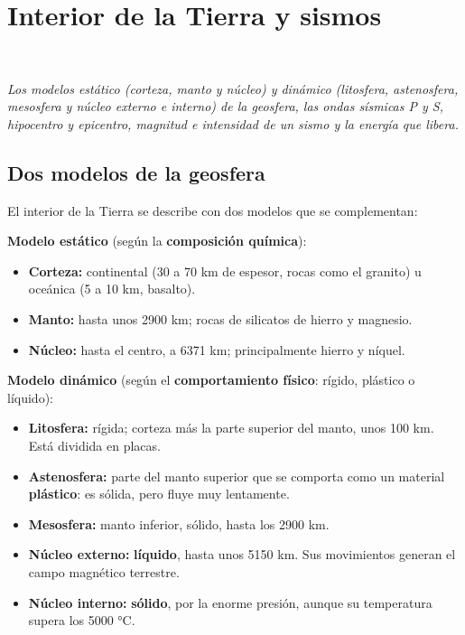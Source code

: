 \section[Interior de la Tierra y sismos]{Interior de la Tierra y sismos}
\modcomun\ \ {\color{gris}\itshape Los modelos estático (corteza, manto y núcleo) y dinámico (litosfera, astenosfera, mesosfera y núcleo externo e interno) de la geosfera, las ondas sísmicas P y S, hipocentro y epicentro, magnitud e intensidad de un sismo y la energía que libera.\par}
\subsection{Dos modelos de la geosfera}
El interior de la Tierra se describe con dos modelos que se complementan:

 

\textbf{Modelo estático} (según la \textbf{composición química}):

 
\begin{itemize}
  \item \textbf{Corteza:} continental (30 a 70 km de espesor, rocas como el granito) u oceánica (5 a 10 km, basalto).
  \item \textbf{Manto:} hasta unos 2900 km; rocas de silicatos de hierro y magnesio.
  \item \textbf{Núcleo:} hasta el centro, a 6371 km; principalmente hierro y níquel.
\end{itemize}
 

\textbf{Modelo dinámico} (según el \textbf{comportamiento físico}: rígido, plástico o líquido):

 
\begin{itemize}
  \item \textbf{Litosfera:} rígida; corteza más la parte superior del manto, unos 100 km. Está dividida en placas.
  \item \textbf{Astenosfera:} parte del manto superior que se comporta como un material \textbf{plástico}: es sólida, pero fluye muy lentamente.
  \item \textbf{Mesosfera:} manto inferior, sólido, hasta los 2900 km.
  \item \textbf{Núcleo externo:} \textbf{líquido}, hasta unos 5150 km. Sus movimientos generan el campo magnético terrestre.
  \item \textbf{Núcleo interno:} \textbf{sólido}, por la enorme presión, aunque su temperatura supera los 5000 °C.
\end{itemize}
  
